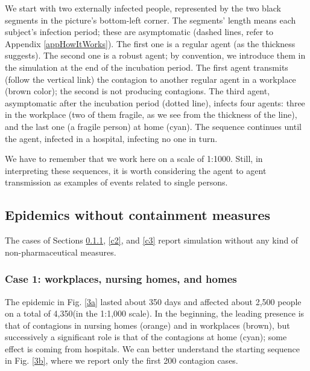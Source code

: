 \documentclass[11pt]{article}
\begin{document}
We start with two externally infected people, represented by the two black segments in the picture's bottom-left corner. The segments' length means each subject's infection period; these are asymptomatic (dashed lines, refer to Appendix \ref{appHowItWorks}). The first one is a regular agent (as the thickness suggests). The second one is a robust agent; by convention, we introduce them in the simulation at the end of the incubation period. The first agent transmits (follow the vertical link) the contagion to another regular agent in a workplace (brown color); the second is not producing contagions. The third agent, asymptomatic after the incubation period (dotted line), infects four agents: three in the workplace (two of them fragile, as we see from the thickness of the line), and the last one (a fragile person) at home (cyan). The sequence continues until the  agent, infected in a hospital, infecting no one in turn.

We have to remember that we work here on a scale of 1:1000. Still, in interpreting these sequences, it is worth considering the agent to agent transmission as examples of events related to single persons.

\subsection{Epidemics without containment measures}

The cases of Sections \ref{c1}, \ref{c2}, and \ref {c3} report simulation without any kind of non-pharmaceutical measures.


\subsubsection{Case 1: workplaces, nursing homes, and homes}
\label{c1}

The epidemic in Fig. \ref{3a} lasted about 350 days and affected about 2,500 people on a total of 4,350(in the 1:1,000 scale). In the beginning, the leading presence is that of contagions in nursing homes (orange) and in workplaces (brown), but successively a significant role is that of the contagions at home (cyan); some effect is coming from hospitals. We can better understand the starting sequence in Fig. \ref{3b}, where we report only the first 200 contagion cases.
  
\end{document}
